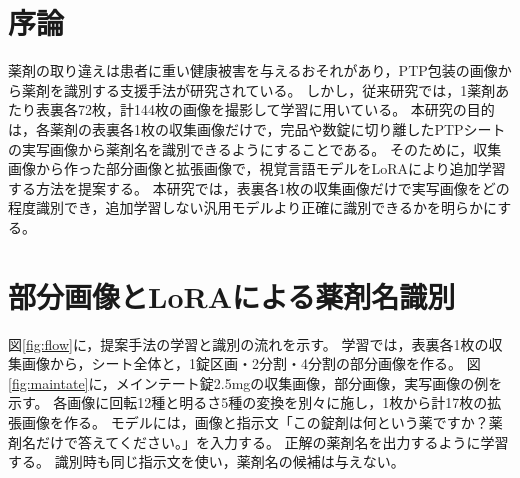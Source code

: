 \documentclass[a4paper,10pt,uplatex,dvipdfmx,twocolumn]{jsarticle}
\begin{document}
\setlength{\abovedisplayskip}{0pt}\setlength{\abovedisplayshortskip}{0pt}\setlength{\belowdisplayshortskip}{0pt}
\setlength{\belowdisplayskip}{0pt}
\fontsize{10}{14.6}\selectfont
{}
\section{序論}
薬剤の取り違えは患者に重い健康被害を与えるおそれがあり，PTP包装の画像から薬剤を識別する支援手法が研究されている\cite{who2017,han2021}。
しかし，従来研究では，1薬剤あたり表裏各72枚，計144枚の画像を撮影して学習に用いている\cite{han2021}。
本研究の目的は，各薬剤の表裏各1枚の収集画像だけで，完品や数錠に切り離したPTPシートの実写画像から薬剤名を識別できるようにすることである。
そのために，収集画像から作った部分画像と拡張画像で，視覚言語モデルをLoRAにより追加学習する方法を提案する。
本研究では，表裏各1枚の収集画像だけで実写画像をどの程度識別でき，追加学習しない汎用モデルより正確に識別できるかを明らかにする。

\section{部分画像とLoRAによる薬剤名識別}
図\ref{fig:flow}に，提案手法の学習と識別の流れを示す。
学習では，表裏各1枚の収集画像から，シート全体と，1錠区画・2分割・4分割の部分画像を作る。
図\ref{fig:maintate}に，メインテート錠2.5mgの収集画像，部分画像，実写画像の例を示す。
各画像に回転12種と明るさ5種の変換を別々に施し，1枚から計17枚の拡張画像を作る。
モデルには，画像と指示文「この錠剤は何という薬ですか？薬剤名だけで答えてください。」を入力する。
正解の薬剤名を出力するように学習する。
識別時も同じ指示文を使い，薬剤名の候補は与えない。
\end{document}
